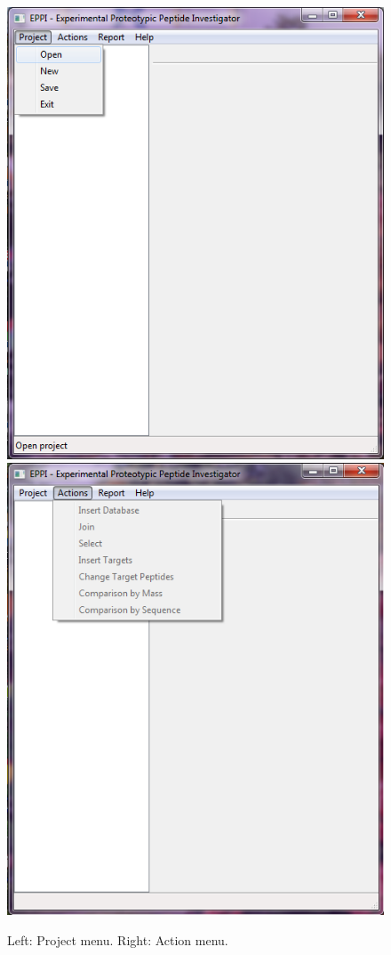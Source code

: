 \documentclass[a4paper,14pt]{extarticle}
\begin{document}
\begin{figure}[htbp]
\centering
\includegraphics[scale=0.5]{open}%
\hspace{5mm}
\includegraphics[scale=0.5]{Action}
\caption{Left: Project menu. Right: Action menu.}\label{fig:project}

\end{figure}
\end{document}
